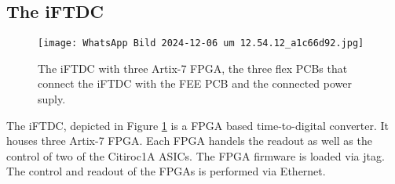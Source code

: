 \subsection{The iFTDC}\label{sec:iFTDC}
\begin{figure}[H]
    \centering
    \texttt{[image: WhatsApp Bild 2024-12-06 um 12.54.12\_a1c66d92.jpg]}
    \caption{The iFTDC with three Artix-7 FPGA, the three flex PCBs that connect the iFTDC with the FEE PCB and the connected power suply.}
    \label{fig:iFTDC}
\end{figure}

The iFTDC, depicted in Figure \ref{fig:iFTDC} is a FPGA based time-to-digital converter. It houses three Artix-7 FPGA.
Each FPGA handels the readout as well as the control  of two of the Citiroc1A ASICs.\autocite{InternalcommunicationIgor}
\newline
The FPGA firmware is loaded via jtag. The control and readout of the FPGAs is performed via Ethernet.









 

